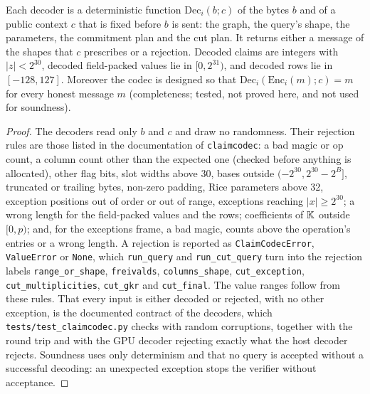 \begin{lemma}
\label{lem:codec-dec}
Each decoder is a deterministic function $\mathrm{Dec}_i(b;c)$ of the bytes $b$ and of a public
context $c$ that is fixed before $b$ is sent: the graph, the query's shape, the parameters, the
commitment plan and the cut plan. It returns either a message of the shapes that $c$ prescribes or
a rejection. Decoded claims are integers with $|z|<2^{30}$, decoded field-packed values lie in
$[0,2^{31})$, and decoded rows lie in $[-128,127]$. Moreover the codec is designed so that
$\mathrm{Dec}_i(\mathrm{Enc}_i(m);c)=m$ for every honest message $m$ (completeness; tested, not
proved here, and not used for soundness).
\end{lemma}

\begin{proof}
The decoders read only $b$ and $c$ and draw no randomness. Their rejection rules are those listed
in the documentation of \texttt{claimcodec}: a bad magic or op count, a column count other than the
expected one (checked before anything is allocated), other flag bits, slot widths above 30, bases
outside $(-2^{30},2^{30}-2^B]$, truncated or trailing bytes, non-zero padding, Rice parameters above
32, exception positions out of order or out of range, exceptions reaching $|x|\ge2^{30}$; a wrong
length for the field-packed values and the rows; coefficients of $\mathbb{K}$ outside $[0,p)$; and, for
the exceptions frame, a bad magic, counts above the operation's entries or a wrong length. A
rejection is reported as \texttt{ClaimCodecError}, \texttt{ValueError} or \texttt{None}, which
\texttt{run\_query} and \texttt{run\_cut\_query} turn into the rejection labels
\texttt{range\_or\_shape}, \texttt{freivalds}, \texttt{columns\_shape}, \texttt{cut\_exception},
\texttt{cut\_multiplicities}, \texttt{cut\_gkr} and \texttt{cut\_final}. The value ranges follow from
these rules. That every input is either decoded or rejected, with no other exception, is the
documented contract of the decoders, which \texttt{tests/test\_claimcodec.py} checks with random
corruptions, together with the round trip and with the GPU decoder rejecting exactly what the host
decoder rejects. Soundness uses only determinism and that no query is accepted without a successful
decoding: an unexpected exception stops the verifier without acceptance.
\end{proof}

